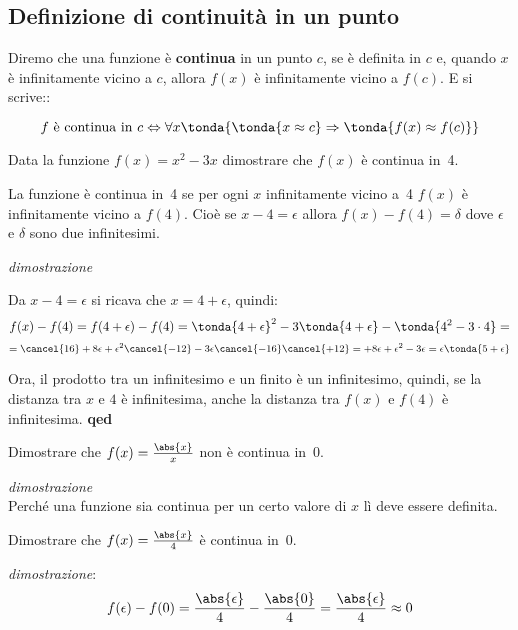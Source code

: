\subsection{Definizione di continuità in un punto}
\label{subsec:cont_definizione}


\begin{definizione}
Diremo che una funzione è \textbf{continua} in un punto \(c\), 
se è definita in \(c\) e, 
quando \(x\) è infinitamente vicino a \(c\), 
allora \(f(x)\) è infinitamente vicino a \(f(c)\). E si scrive::

\[f \text{ è continua in } c \Leftrightarrow 
\forall x \tonda{\tonda{x \approx c} \Rightarrow 
\tonda{f(x) \approx f(c)}}\]

\end{definizione}

\begin{esempio}
 Data la funzione \(f(x)=x^2-3x\) dimostrare che \(f(x)\) è continua in~4.
 
 La funzione è continua in~4 se per ogni \(x\) infinitamente vicino a~4 
 \(f(x)\) è infinitamente vicino a \(f(4)\). Cioè se \(x -4=\epsilon\) allora
 \(f(x) -f(4) = \delta\) dove \(\epsilon\) e \(\delta\) sono due infinitesimi.
 
\emph{dimostrazione}

Da \(x-4=\epsilon\) si ricava che \(x=4+\epsilon\), quindi: 
\[f(x) -f(4) = f(4+\epsilon) -f(4) = 
\tonda{4+\epsilon}^2-3\tonda{4+\epsilon}-\tonda{4^2-3\cdot 4}=\]
\[=\cancel{16}+8\epsilon+\epsilon^2\cancel{-12} 
  -3\epsilon\cancel{-16}\cancel{+12} = 
  +8\epsilon+\epsilon^2 -3\epsilon = 
\epsilon \tonda{5 + \epsilon}\]

Ora, il prodotto tra un infinitesimo e un finito è un infinitesimo, quindi, se 
la distanza tra \(x\) e \(4\) è infinitesima, anche la distanza tra 
\(f(x)\) e \(f(4)\) è infinitesima. \hfill \textbf{qed} 
 
\end{esempio}

\begin{esempio}
 Dimostrare che \(f(x)=\frac{\abs{x}}{x}\) non è continua in~0.
 
\emph{dimostrazione}\\
Perché una funzione sia continua per un certo valore di \(x\) lì deve essere 
definita. 
\end{esempio}

\begin{esempio}
 Dimostrare che \(f(x)=\frac{\abs{x}}{4}\) è continua in~0.
 
\emph{dimostrazione}:
\[f(\epsilon) - f(0) = \frac{\abs{\epsilon}}{4} - \frac{\abs{0}}{4} = 
 \frac{\abs{\epsilon}}{4} \approx 0\]
\end{esempio}


